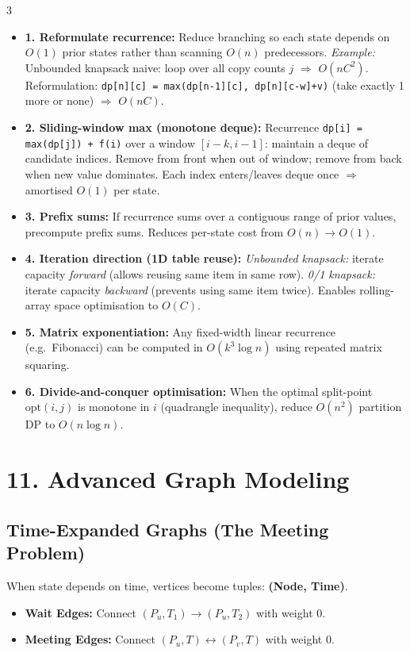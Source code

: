 \documentclass[7pt,landscape]{extarticle}
\newcommand{\code}[1]{\texttt{\fontsize{6pt}{7pt}\selectfont #1}}
\begin{document}
\begin{multicols*}{3}
\begin{itemize}[leftmargin=1.1em, itemsep=2pt, topsep=2pt]
\item \textbf{1. Reformulate recurrence:} Reduce branching so each state depends on $O(1)$ prior states rather than scanning $O(n)$ predecessors. \textit{Example:} Unbounded knapsack naive: loop over all copy counts $j$ $\Rightarrow$ $O(nC^2)$. Reformulation: \code{dp[n][c] = max(dp[n-1][c], dp[n][c-w]+v)} (take exactly 1 more or none) $\Rightarrow$ $O(nC)$.

\item \textbf{2. Sliding-window max (monotone deque):} Recurrence \code{dp[i] = max(dp[j]) + f(i)} over a window $[i-k, i-1]$: maintain a deque of candidate indices. Remove from front when out of window; remove from back when new value dominates. Each index enters/leaves deque once $\Rightarrow$ amortised $O(1)$ per state.

\item \textbf{3. Prefix sums:} If recurrence sums over a contiguous range of prior values, precompute prefix sums. Reduces per-state cost from $O(n) \to O(1)$.

\item \textbf{4. Iteration direction (1D table reuse):} \textit{Unbounded knapsack:} iterate capacity \emph{forward} (allows reusing same item in same row). \textit{0/1 knapsack:} iterate capacity \emph{backward} (prevents using same item twice). Enables rolling-array space optimisation to $O(C)$.

\item \textbf{5. Matrix exponentiation:} Any fixed-width linear recurrence (e.g.\ Fibonacci) can be computed in $O(k^3 \log n)$ using repeated matrix squaring.

\item \textbf{6. Divide-and-conquer optimisation:} When the optimal split-point $\text{opt}(i,j)$ is monotone in $i$ (quadrangle inequality), reduce $O(n^2)$ partition DP to $O(n \log n)$.
\end{itemize}

\section*{11. Advanced Graph Modeling}
\subsection*{Time-Expanded Graphs (The Meeting Problem)}
When state depends on time, vertices become tuples: \textbf{(Node, Time)}. 
\begin{itemize}
    \item \textbf{Wait Edges:} Connect $(P_u, T_1) \to (P_u, T_2)$ with weight 0.
    \item \textbf{Meeting Edges:} Connect $(P_u, T) \leftrightarrow (P_v, T)$ with weight 0.
\end{itemize}


\end{multicols*}
\end{document}

